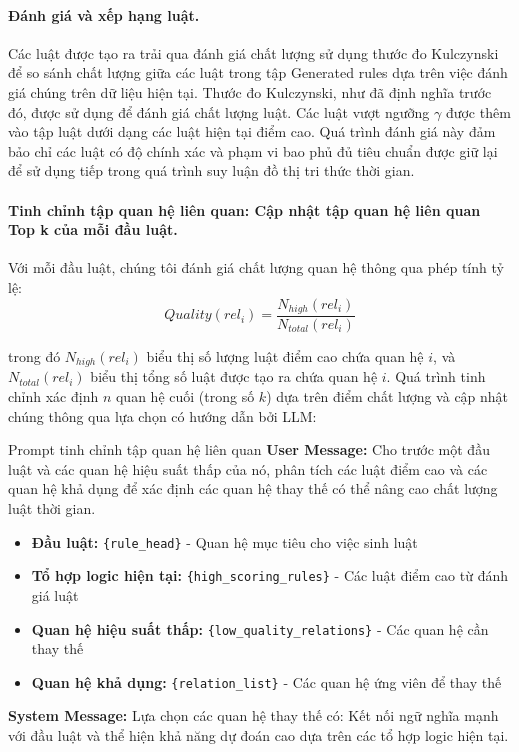 \paragraph{Đánh giá và xếp hạng luật.}
Các luật được tạo ra trải qua đánh giá chất lượng sử dụng thước đo Kulczynski để so sánh chất lượng giữa các luật trong tập Generated rules dựa trên việc đánh giá chúng trên dữ liệu hiện tại. Thước đo Kulczynski, như đã định nghĩa trước đó, được sử dụng để đánh giá chất lượng luật. Các luật vượt ngưỡng $\gamma$ được thêm vào tập luật dưới dạng các luật hiện tại điểm cao. Quá trình đánh giá này đảm bảo chỉ các luật có độ chính xác và phạm vi bao phủ đủ tiêu chuẩn được giữ lại để sử dụng tiếp trong quá trình suy luận đồ thị tri thức thời gian.

\paragraph{Tinh chỉnh tập quan hệ liên quan: Cập nhật tập quan hệ liên quan Top k của mỗi đầu luật.}
Với mỗi đầu luật, chúng tôi đánh giá chất lượng quan hệ thông qua phép tính tỷ lệ:
\begin{equation}
    \tag{4}
    \label{eq4}
    Quality(rel_i) = \frac{N_{high}(rel_i)}{N_{total}(rel_i)}
\end{equation}

trong đó $N_{high}(rel_i)$ biểu thị số lượng luật điểm cao chứa quan hệ $i$, và $N_{total}(rel_i)$ biểu thị tổng số luật được tạo ra chứa quan hệ $i$. Quá trình tinh chỉnh xác định $n$ quan hệ cuối (trong số $k$) dựa trên điểm chất lượng và cập nhật chúng thông qua lựa chọn có hướng dẫn bởi LLM:

\begin{promptbox}{Prompt tinh chỉnh tập quan hệ liên quan}
\textbf{User Message:}
Cho trước một đầu luật và các quan hệ hiệu suất thấp của nó, phân tích các luật điểm cao và các quan hệ khả dụng để xác định các quan hệ thay thế có thể nâng cao chất lượng luật thời gian.
\begin{itemize}
    \item \textbf{Đầu luật:} \texttt{\{rule\_head\}} - Quan hệ mục tiêu cho việc sinh luật
    \item \textbf{Tổ hợp logic hiện tại:} \texttt{\{high\_scoring\_rules\}} - Các luật điểm cao từ đánh giá luật
    \item \textbf{Quan hệ hiệu suất thấp:} \texttt{\{low\_quality\_relations\}} - Các quan hệ cần thay thế
    \item \textbf{Quan hệ khả dụng:} \texttt{\{relation\_list\}} - Các quan hệ ứng viên để thay thế
\end{itemize}

\textbf{System Message:} Lựa chọn các quan hệ thay thế có: Kết nối ngữ nghĩa mạnh với đầu luật và thể hiện khả năng dự đoán cao dựa trên các tổ hợp logic hiện tại.
\end{promptbox}

